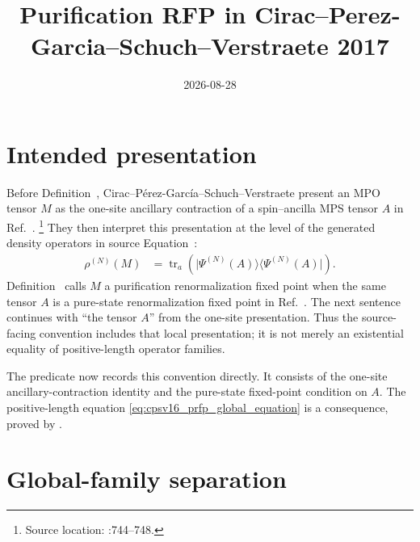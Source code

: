 \documentclass{article}
\title{Purification RFP in Cirac--Perez-Garcia--Schuch--Verstraete 2017}
\author{}
\date{2026-08-28}
\begin{document}
\maketitle
{}

\section{Intended presentation}

Before Definition~,
Cirac--P\'erez-Garc\'ia--Schuch--Verstraete present an MPO tensor $M$ as the
one-site ancillary contraction  of a spin--ancilla MPS tensor
$A$ in Ref.~\cite{Cirac2016MPDO_arXiv}.
\footnote{Source location:
:744--748.}
They then interpret this presentation at the level of the generated density
operators in source Equation~:
\begin{align}
    \rho^{(N)}(M)
        &=
        \operatorname{tr}_a\!\left(\lvert\Psi^{(N)}(A)\rangle\langle\Psi^{(N)}(A)\rvert\right).
    \label{eq:cpsv16_prfp_global_equation}
\end{align}
Definition~ calls $M$ a purification renormalization
fixed point when the same tensor $A$ is a pure-state renormalization fixed point
in Ref.~\cite{Cirac2016MPDO_arXiv}. The next sentence continues with ``the
tensor $A$'' from the one-site presentation. Thus the
source-facing convention includes that local presentation; it is not merely an
existential equality of positive-length operator families.

The predicate  now records this convention directly.
It consists of the one-site ancillary-contraction identity and the pure-state
fixed-point condition on $A$. The positive-length equation
\eqref{eq:cpsv16_prfp_global_equation} is a consequence, proved by
.

\section{Global-family separation}
\end{document}
